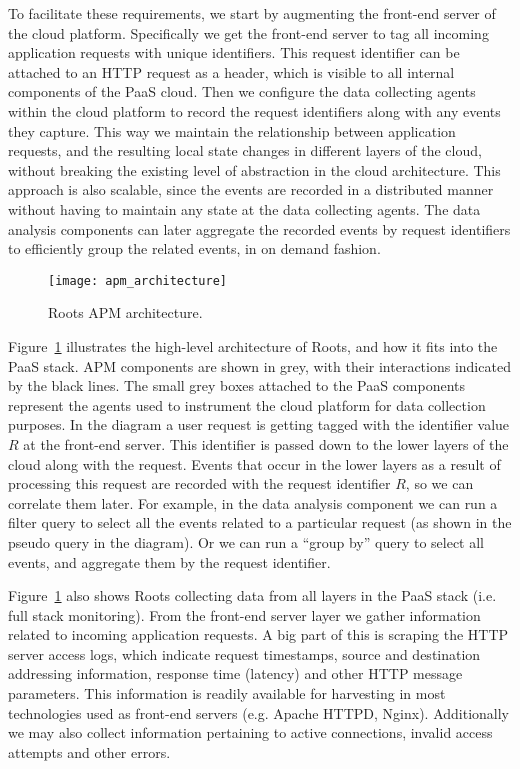 To facilitate these requirements, we start by augmenting the front-end server of the cloud platform. 
Specifically we get the front-end server to tag all incoming application requests with unique identifiers.
This request identifier can be attached to an HTTP request as a header, which is visible to all 
internal components of the PaaS cloud. Then we configure the data collecting agents within the 
cloud platform to record the request identifiers along with any events they capture. 
This way we maintain the relationship between application requests, and the resulting
local state changes in different layers of the cloud, without breaking the existing level
of abstraction in the cloud architecture. This approach is also scalable, since the events are
recorded in a distributed manner without having to maintain any state at the data collecting agents. 
The data analysis components can later
aggregate the recorded events by request identifiers to efficiently group the related events,
in on demand fashion.

\begin{figure}
\centering
\texttt{[image: apm\_architecture]}
\caption{Roots APM architecture.}
\label{fig:apm_architecture}
\end{figure}

Figure~\ref{fig:apm_architecture} illustrates the high-level architecture of Roots, and how 
it fits into the PaaS stack. APM components are shown in grey, with their interactions indicated
by the black lines. The small grey boxes attached to the PaaS components represent the
agents used to instrument the cloud platform for data collection purposes. 
In the diagram a user request is getting tagged with the identifier value
$R$ at the front-end server. This identifier is passed down to the lower layers of the cloud
along with the request. Events that occur in the lower layers as a result of processing this request
are recorded with the request identifier $R$, so we can correlate them later. For example, in the 
data analysis component we can run a filter query to select all the events related to a particular
request (as shown in the pseudo query in the diagram). Or we can run a ``group by'' 
query to select all events, and aggregate them by the request identifier.

Figure~\ref{fig:apm_architecture} also shows Roots collecting data from all layers in the 
PaaS stack (i.e. full stack monitoring). 
From the front-end server layer we gather information related to incoming application
requests. A big part of this is scraping the HTTP server access logs, which indicate request timestamps,
source and destination addressing information, response time (latency) and other HTTP message
parameters. This information is readily available for harvesting in most technologies used as front-end
servers (e.g. Apache HTTPD, Nginx). Additionally we may also collect information pertaining to active
connections, invalid access attempts and other errors.

